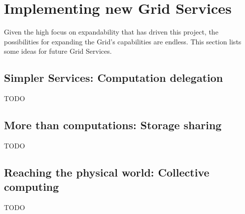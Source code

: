 \section{Implementing new Grid Services}
Given the high focus on expandability that has driven this project, the possibilities for expanding the Grid's capabilities are endless. This section lists some ideas for future Grid Services.

\subsection{Simpler Services: Computation delegation}
TODO

\subsection{More than computations: Storage sharing}
TODO

\subsection{Reaching the physical world: Collective computing}
TODO